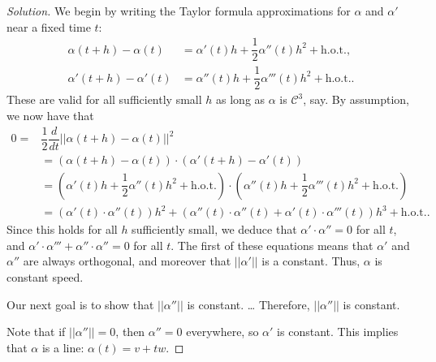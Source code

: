 \documentclass[Shifrin_Solutions_Spring_2018]{subfiles}
\begin{document}
\begin{proof}[Solution] We begin by writing the Taylor formula approximations for $\alpha$ and $\alpha'$ near a fixed time $t$:
\begin{align*}
\alpha(t+h) - \alpha(t) & = \alpha'(t) h + \dfrac{1}{2}\alpha''(t) h^2 + \mbox{h.o.t.},  \\
\alpha'(t+h) - \alpha'(t) & = \alpha''(t) h + \dfrac{1}{2}\alpha'''(t) h^2 + \mbox{h.o.t.} .
\end{align*}
These are valid for all sufficiently small $h$ as long as $\alpha$ is $\mathcal{C}^3$, say.
By assumption, we now have that
\[
\begin{split}
0 = &  \dfrac{1}{2} \dfrac{d}{dt}\left|\left| \alpha(t+h) -\alpha(t) \right|\right|^2 \\
	& = \left( \alpha(t+h) - \alpha(t) \right) \cdot \left( \alpha'(t+h) - \alpha'(t) \right) \\
	& = \left( \alpha'(t) h + \dfrac{1}{2}\alpha''(t) h^2 + \mbox{h.o.t.} \right) \cdot \left( \alpha''(t) h + \dfrac{1}{2}\alpha'''(t) h^2 + \mbox{h.o.t.} \right) \\
	& = (\alpha'(t)\cdot \alpha''(t) ) h^2 + ( \alpha''(t)\cdot \alpha''(t) + \alpha'(t) \cdot \alpha'''(t) ) h^3 + \mbox{h.o.t.} .
\end{split}
\]
Since this holds for all $h$ sufficiently small, we deduce that $\alpha' \cdot \alpha'' = 0$ for all $t$, and $\alpha'\cdot \alpha''' +\alpha'' \cdot \alpha''=0$ for all $t$.
The first of these equations means that $\alpha'$ and $\alpha''$ are always orthogonal, and moreover that $||\alpha'||$ is a constant. Thus, $\alpha$ is constant speed.

Our next goal is to show that $||\alpha''||$ is constant.
\dots {}
Therefore, $||\alpha''||$ is constant.

Note that if $||\alpha''|| = 0$, then $\alpha''=0$ everywhere, so $\alpha'$ is constant. This implies that $\alpha$ is a line: $\alpha(t) = v+ t w$.


\end{proof}
\end{document}
